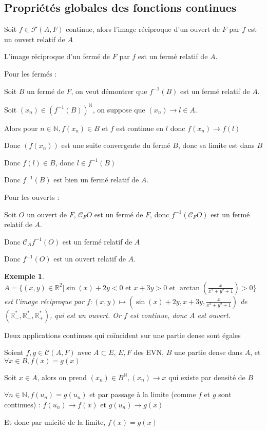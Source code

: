 \documentclass[a4paper,12pt]{book}
\newcommand{\Prop}[2]{\begin{tcolorbox}[sharp corners, colback=white,colframe=red!90!black!75, title=Proposition : #1]#2\end{tcolorbox}}
\newcommand{\Pre}[1]{\begin{tcolorbox}[sharp corners, colback=white,colframe=green!60!green!30!black!75, title=Preuve]#1\end{tcolorbox}}
\newtheorem{Exe}{Exemple}[section]
\def\R{\mathbb{R}}
\def\N{\mathbb{N}}
\begin{document}
\subsection{Propriétés globales des fonctions continues}
\Prop{Images réciproques}{Soit $f\in\mathcal{F}(A,F)$ continue, alors l'image réciproque d'un ouvert de $F$ par $f$ est un ouvert relatif de $A$
\par L'image réciproque d'un fermé de $F$ par $f$ est un fermé relatif de $A$.}
\Pre{Pour les fermés : \par Soit $B$ un fermé de $F$, on veut démontrer que $f^{-1}(B)$ est un fermé relatif de $A$. \par Soit $(x_n)\in (f^{-1}(B))^\N$, on suppose que $(x_n)\to l\in A$. \par Alors pour $n\in\N, f(x_n)\in B$ et $f$ est continue en $l$ donc $f(x_n)\to f(l)$\par Donc $(f(x_n))$ est une suite convergente du fermé $B$, donc sa limite est dans $B$ \par Donc $f(l)\in B$, donc $l\in f^{-1}(B)$ \par Donc $f^{-1}(B)$ est bien un fermé relatif de $A$.
\par Pour les ouverts : \par Soit $O$ un ouvert de $F$, $\mathcal{C}_FO$ est un fermé de $F$, donc $f^{-1}(\mathcal{C}_FO)$ est un fermé relatif de $A$.\par Donc $\mathcal{C}_Af^{-1}(O)$ est un fermé relatif de $A$ \par Donc $f^{-1}(O)$ est un ouvert relatif de $A$.}
\begin{Exe}
$A=\{(x,y)\in\R^2\vert\sin(x)+2y<0\text{ et }x+3y>0\text{ et }\arctan(\frac{x}{x^2+y^2+1})>0\}$ est l'image réciproque par $f:(x,y)\mapsto\left(\sin(x)+2y, x+3y, \frac{x}{x^2+y^2+1}\right)$ de $(\R_-^*, \R_+^*,\R_+^*)$, qui est un ouvert. Or $f$ est continue, donc $A$ est ouvert.
\end{Exe}
\Prop{Continuité coïncidante}{Deux applications continues qui coïncident sur une partie dense sont égales}
\Pre{Soient $f,g\in\mathcal{C}(A,F)$ avec $A\subset E$, $E,F$ des EVN, $B$ une partie dense dans $A$, et $\forall x\in B, f(x)=g(x)$ \par Soit $x\in A$, alors on prend $(x_n)\in B^\N,(x_n)\to x$ qui existe par densité de $B$ \par $\forall n\in\N, f(u_n)=g(u_n)$ et par passage à la limite (comme $f$ et $g$ sont continues) : $f(u_n)\to f(x)$ et $g(u_n)\to g(x)$ \par Et donc par unicité de la limite, $f(x)=g(x)$}
\end{document}
